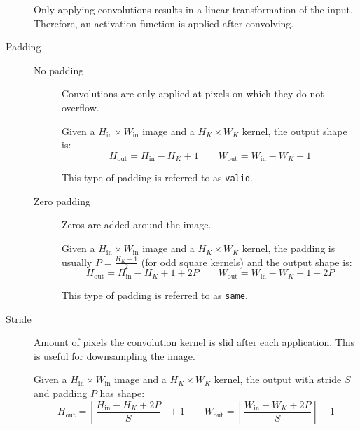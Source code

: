 \begin{description}
        \begin{remark}
            Only applying convolutions results in a linear transformation of the input. Therefore, an activation function is applied after convolving.
        \end{remark}

    \item[Padding] 
        \phantom{}
        \begin{description}
            \item[No padding] 
                Convolutions are only applied at pixels on which they do not overflow.

                Given a $H_\text{in} \times W_\text{in}$ image and a $H_K \times W_K$ kernel,
                the output shape is:
                \[ H_\text{out} = H_\text{in} - H_K + 1 \hspace{2em} W_\text{out} = W_\text{in} - W_K + 1 \]

                \begin{remark}
                    This type of padding is referred to as \texttt{valid}.
                \end{remark}

            \item[Zero padding] 
                Zeros are added around the image.

                Given a $H_\text{in} \times W_\text{in}$ image and a $H_K \times W_K$ kernel,
                the padding is usually $P=\frac{H_K-1}{2}$ (for odd square kernels) and the output shape is:
                \[ H_\text{out} = H_\text{in} - H_K + 1 + 2P \hspace{2em} W_\text{out} = W_\text{in} - W_K + 1 + 2P \]

                \begin{remark}
                    This type of padding is referred to as \texttt{same}.
                \end{remark}
        \end{description}

        
    \item[Stride] 
        Amount of pixels the convolution kernel is slid after each application. This is useful for downsampling the image.

        Given a $H_\text{in} \times W_\text{in}$ image and a $H_K \times W_K$ kernel,
        the output with stride $S$ and padding $P$ has shape:
        \[ 
            H_\text{out} = \left\lfloor \frac{H_\text{in} - H_K + 2P}{S} \right\rfloor + 1
            \hspace{2em} 
            W_\text{out} = \left\lfloor \frac{W_\text{in} - W_K + 2P}{S} \right\rfloor + 1
        \]
        

\end{description}
